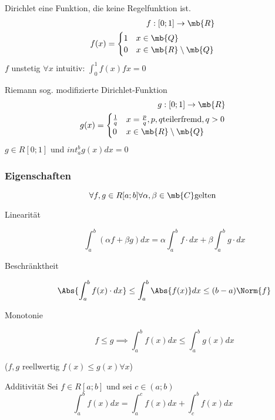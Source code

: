 \begin{Bsp}{Dirichlet}
  eine Funktion, die keine Regelfunktion ist.
  \begin{align*}
    f:[0;1]\to\mb{R}\\
    f(x)=\begin{cases}
      1 & x\in \mb{Q}\\
      0 & x\in \mb{R}\setminus\mb{Q}
    \end{cases}
  \end{align*}
  $f$ unstetig $\forall x$ intuitiv: $\int^1_0 f(x)fx =0$
\end{Bsp}
\begin{Bsp}{Riemann}
  sog. modifizierte Dirichlet-Funktion
  \begin{align*}
    g:[0;1]\to\mb{R}\\
    g(x)=\begin{cases}
      \frac{1}{q}  & x=\frac{p}{q}, p,q \text{teilerfremd}, q>0\\
      0 & x\in \mb{R}\setminus \mb{Q}
    \end{cases}
  \end{align*}
  $g\in R[0;1]$ und $int^b_ag(x)dx=0$
\end{Bsp}
\subsubsection{Eigenschaften}
\begin{Sat}
  \[\forall f, g\in R [a;b] \forall \alpha,\beta\in \mb{C} \text{gelten}\]
  \begin{description}
    \item[Linearität] \[\int^b_a(\alpha f+ \beta g)dx = \alpha \int^b_af\cdot dx+\beta\int^b_a g\cdot dx\]
    \item[Beschränktheit] \[\Abs{\int^b_a f(x)\cdot dx}\leq \int^b_a\Abs{f(x)}dx\leq (b-a)\Norm{f}\]
    \item[Monotonie] \[f\leq g \implies \int^b_af(x)dx\leq \int^b_ag(x)dx\]
  \end{description}
  ($f,g$ reellwertig $f(x)\leq g(x)\forall x$)
\end{Sat}
\begin{Sat}{Additivität}
  Sei $f\in R[a;b]$ und sei $c\in (a;b)$
  \[\int^b_af(x)dx=\int^c_a f(x)dx+\int^b_cf(x)dx\]
\end{Sat}
